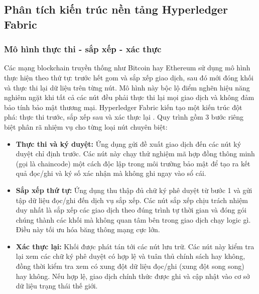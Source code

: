 \documentclass[12pt,a4paper]{article}
\begin{document}
\subsection{Phân tích kiến trúc nền tảng Hyperledger Fabric}

\subsubsection{Mô hình thực thi - sắp xếp - xác thực}
Các mạng blockchain truyền thống như Bitcoin hay Ethereum sử dụng mô hình thực hiện theo thứ tự: trước hết gom và sắp xếp giao dịch, sau đó mới đóng khối và thực thi lại dữ liệu trên từng nút. Mô hình này bộc lộ điểm nghẽn hiệu năng nghiêm ngặt khi tất cả các nút đều phải thực thi lại mọi giao dịch và không đảm bảo tính bảo mật thương mại.
Hyperledger Fabric kiến tạo một kiến trúc đột phá: thực thi trước, sắp xếp sau và xác thực lại \cite{fabric}. Quy trình gồm 3 bước riêng biệt phân rã nhiệm vụ cho từng loại nút chuyên biệt:
\begin{itemize}
    \item \textbf{Thực thi và ký duyệt:} Ứng dụng gửi đề xuất giao dịch đến các nút ký duyệt chỉ định trước. Các nút này chạy thử nghiệm mã hợp đồng thông minh (gọi là chaincode) một cách độc lập trong môi trường bảo mật để tạo ra kết quả đọc/ghi và ký số xác nhận mà không ghi ngay vào sổ cái.
    \item \textbf{Sắp xếp thứ tự:} Ứng dụng thu thập đủ chữ ký phê duyệt từ bước 1 và gửi tập dữ liệu đọc/ghi đến dịch vụ sắp xếp. Các nút sắp xếp chịu trách nhiệm duy nhất là sắp xếp các giao dịch theo đúng trình tự thời gian và đóng gói chúng thành các khối mà không quan tâm bên trong giao dịch chạy logic gì. Điều này tối ưu hóa băng thông mạng cực lớn.
    \item \textbf{Xác thực lại:} Khối được phát tán tới các nút lưu trữ. Các nút này kiểm tra lại xem các chữ ký phê duyệt có hợp lệ và tuân thủ chính sách hay không, đồng thời kiểm tra xem có xung đột dữ liệu đọc/ghi (xung đột song song) hay không. Nếu hợp lệ, giao dịch chính thức được ghi và cập nhật vào cơ sở dữ liệu trạng thái thế giới.
\end{itemize}
\end{document}
